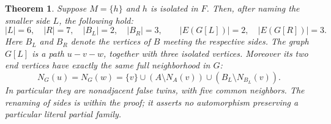 \documentclass[11pt]{article}
\newtheorem{theorem}{Theorem}\newtheorem{lemma}[theorem]{Lemma}
\begin{document}
\begin{theorem}\label{main}
Suppose $M=\{h\}$ and $h$ is isolated in $F$. Then, after naming the
smaller side $L$, the following hold:
\[
 |L|=6,\quad |R|=7,\quad |B_L|=2,\quad |B_R|=3,
 \qquad |E(G[L])|=2,\quad |E(G[R])|=3.
\]
Here $B_L$ and $B_R$ denote the vertices of $B$ meeting the respective
sides. The graph $G[L]$ is a path $u-v-w$, together with three isolated
vertices. Moreover its two end vertices have exactly the same full
neighborhood in $G$:
\[
 N_G(u)=N_G(w)=\{v\}\cup(A\setminus N_A(v))
                         \cup(B_L\setminus N_{B_L}(v)).       \tag{1}
\]
In particular they are nonadjacent false twins, with five common neighbors.
The renaming of sides is within the proof; it asserts no automorphism
preserving a particular literal partial family.
\end{theorem}
\end{document}

